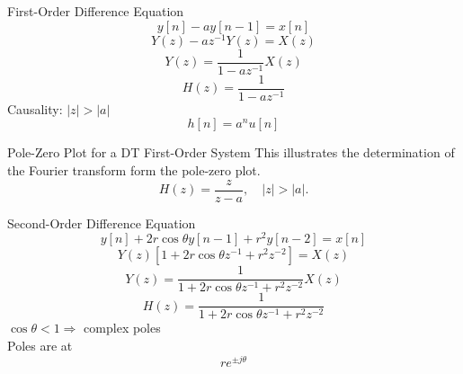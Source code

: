 \begin{frame}{First-Order Difference Equation}
    \begin{equation*}
        y[n] - ay[n-1] = x[n]
    \end{equation*}
    \pause
    {
        \begin{equation*}
            Y(z) - az^{-1}Y(z) = X(z)
        \end{equation*}
        \pause
        \begin{equation*}
            Y(z) = \frac{1}{1 - az^{-1}} X(z)
        \end{equation*}
        \pause
        \begin{equation*}
            H(z) = \frac{1}{1 - az^{-1}}
        \end{equation*}
        Causality: \pause $|z|>|a|$
        \pause
        \begin{equation*}
            h[n] = a^nu[n]
        \end{equation*}
    }
\end{frame}


\begin{frame}{Pole-Zero Plot for a DT First-Order System}
    This illustrates the determination of the Fourier transform form the pole-zero plot.
    \begin{equation*}
        H(z) = \frac{z}{z-a}, \quad |z| >|a|.
    \end{equation*}
    {
        \begin{center}
            
        \end{center}
    }
\end{frame}

\begin{frame}{Second-Order Difference Equation}
    \begin{equation*}
        y[n] + 2r\cos\theta y[n-1] + r^2y[n-2]= x[n]
    \end{equation*}
    \pause
    {
        \begin{equation*}
            Y(z)\left[1+2r\cos\theta z^{-1} + r^2z^{-2}\right] = X(z)
        \end{equation*}
        \pause
        \begin{equation*}
            Y(z) = \frac{1}{1+2r\cos\theta z^{-1} + r^2z^{-2}} X(z)
        \end{equation*}
        \pause
        \begin{equation*}
            H(z) = \frac{1}{1+2r\cos\theta z^{-1} + r^2z^{-2}}
        \end{equation*}
        $\cos\theta < 1 \Rightarrow$  complex poles\\
        Poles are at
        \pause
        \begin{equation*}
            re^{\pm j \theta}
        \end{equation*}
    }
\end{frame}

